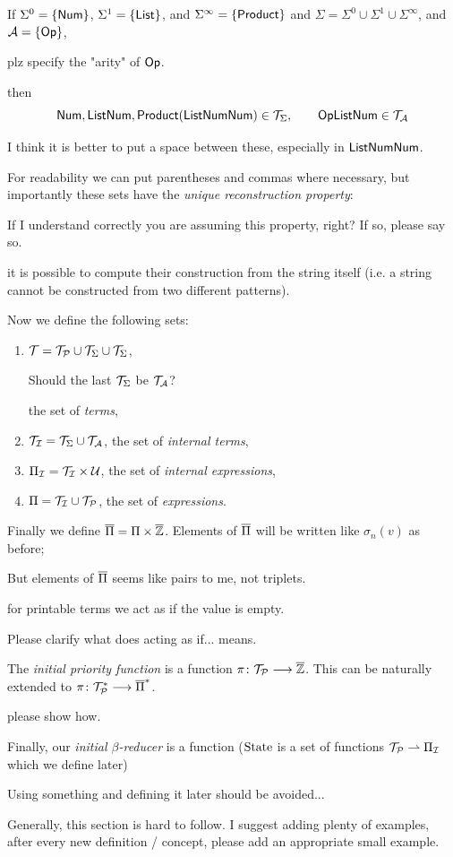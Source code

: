 \documentclass{llncs}
\newcommand{\yoni}[1]{{\begin{mdframed}[linecolor=red]{\color{red}#1}\end{mdframed}}}
\begin{document}
\begin{example}
If $\Sigma^{0}=\{\mathsf{Num}\}$,
$\Sigma^{1}=\{\mathsf{List}\}$, and $\Sigma^{\infty}=\{\mathsf{Product}\}$
and $\Sigma=\Sigma^0\cup\Sigma^1\cup\Sigma^\infty$,
 and $\mathcal A=\set{\OP}$, 
\yoni{plz specify the "arity" of $\mathsf{Op}$.}
 then
\[ \mathsf{Num},\mathsf{List}\mathsf{Num},\mathsf{Product}(\mathsf{List}\mathsf{Num}\mathsf{Num})\in\mathcal T_{\Sigma},\qquad \mathsf{Op}\mathsf{List}\mathsf{Num}\in\mathcal T_{\mathcal A} \]
\yoni{I think it is better to put a space between these, especially
in $\mathsf{List}\mathsf{Num}\mathsf{Num}$.}
\end{example}
For readability we can put parentheses and commas where necessary, but importantly these sets have the \textit{unique reconstruction property}:
\yoni{If I understand correctly you are assuming this property, right? If so, please say so.}
it is possible to compute their construction from the
string itself (i.e. a string cannot be constructed from two different patterns).

Now we define the following sets:
\begin{enumerate}
    \item $\mathcal T=\mathcal T_{\mathcal P}\cup\mathcal T_{\Sigma}\cup\mathcal T_{\Sigma}$, 
\yoni{Should the last $\mathcal T_{\Sigma}$ be $\mathcal T_{\mathcal A}$?}
    the set of \textit{terms},
    \item $\mathcal T_{\mathcal I}=\mathcal T_{\Sigma}\cup\mathcal T_{\mathcal A}$, the set of \textit{internal terms},
    \item $\Pi_{\mathcal I}=\mathcal T_{\mathcal I}\times\mathcal U$, the set of \textit{internal expressions},
    \item $\Pi=\mathcal T_{\mathcal I}\cup\mathcal T_{\mathcal P}$, the set of \textit{expressions}.
\end{enumerate}
Finally we define $\overline{\Pi}=\Pi\times\overline{\mathbb Z}$.
Elements of $\overline{\Pi}$ will be written like $\sigma_n(v)$ as before; 
\yoni{But elements of $\overline{\Pi}$ seems like pairs to me, not triplets.}
for printable terms we act as if the value is empty.
\yoni{Please clarify what does acting as if... means.}

The \textit{initial priority function} is a function $\pi\colon\mathcal T_{\mathcal P}\longrightarrow\overline{\mathbb Z}$.
This can be naturally extended to $\pi\colon\mathcal T_{\mathcal P}^*\longrightarrow\overline{\Pi}^*$.
\yoni{please show how.}

Finally, our \textit{initial $\beta$-reducer} is a function ($\mathrm{State}$ is a set of functions $\mathcal T_{\mathcal P}\rightharpoonup\Pi_{\mathcal I}$ which we define later)
\yoni{Using something and defining it later should be avoided...}

\yoni{Generally, this section is hard to follow. I suggest adding plenty of examples, after every new definition / concept, please add an appropriate small example.}
\end{document}
